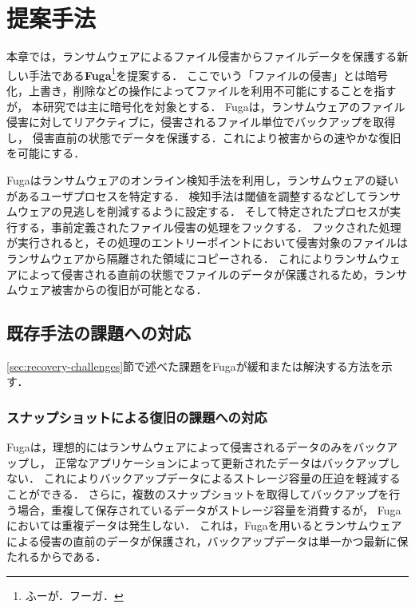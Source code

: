 \chapter{提案手法}
\label{chap:approach}
本章では，ランサムウェアによるファイル侵害からファイルデータを保護する新しい手法である\textbf{Fuga}\footnote{ふーが．フーガ．}を提案する．
ここでいう「ファイルの侵害」とは暗号化，上書き，削除などの操作によってファイルを利用不可能にすることを指すが，
本研究では主に暗号化を対象とする．
Fugaは，ランサムウェアのファイル侵害に対してリアクティブに，侵害されるファイル単位でバックアップを取得し，
侵害直前の状態でデータを保護する．これにより被害からの速やかな復旧を可能にする．

Fugaはランサムウェアのオンライン検知手法を利用し，ランサムウェアの疑いがあるユーザプロセスを特定する．
検知手法は閾値を調整するなどしてランサムウェアの見逃しを削減するように設定する．
そして特定されたプロセスが実行する，事前定義されたファイル侵害の処理をフックする．
フックされた処理が実行されると，その処理のエントリーポイントにおいて侵害対象のファイルはランサムウェアから隔離された領域にコピーされる．
これによりランサムウェアによって侵害される直前の状態でファイルのデータが保護されるため，ランサムウェア被害からの復旧が可能となる．

\section{既存手法の課題への対応}
\ref{sec:recovery-challenges}節で述べた課題をFugaが緩和または解決する方法を示す．
\subsection{スナップショットによる復旧の課題への対応}
Fugaは，理想的にはランサムウェアによって侵害されるデータのみをバックアップし，
正常なアプリケーションによって更新されたデータはバックアップしない．
これによりバックアップデータによるストレージ容量の圧迫を軽減することができる．
さらに，複数のスナップショットを取得してバックアップを行う場合，重複して保存されているデータがストレージ容量を消費するが，
Fugaにおいては重複データは発生しない．
これは，Fugaを用いるとランサムウェアによる侵害の直前のデータが保護され，バックアップデータは単一かつ最新に保たれるからである．

